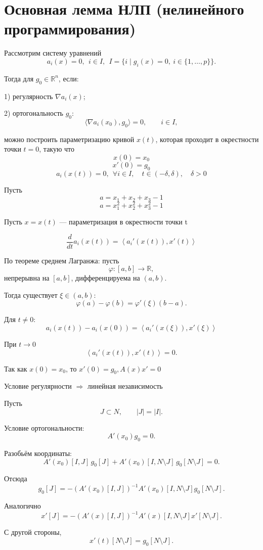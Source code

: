 \documentclass[12pt,a4paper]{article}
\begin{document}
\newpage

\section{Основная лемма НЛП (нелинейного программирования)}

Рассмотрим систему уравнений
\[
a_i(x)=0,
\ \
i\in I,
\ \ 
I=\{i\mid g_i(x)=0,\ i\in\{1,\ldots,p\}\}.
\]

Тогда для $g_0\in\mathbb{R}^n$, если:

1) регулярность $\nabla a_i(x)$;

2) ортогональность $g_0$:
\[
\langle\nabla a_i(x_0),g_0\rangle=0,
\qquad i\in I,
\]

можно построить параметризацию кривой $x(t)$, которая проходит в окрестности точки $t=0$, такую что
\[
x(0)=x_0
\]
\[
x'(0)=g_0
\]
\[
a_i(x(t))=0,
\ \
\forall i\in I,\quad
t\in(-\delta,\delta),\quad \delta>0
\]

Пусть
\[
a=x_1+x_2+x_3-1
\]
\[
a=x_1^2+x_2^2+x_3^2-1
\]

Пусть $x=x(t)$ --- параметризация в окрестности точки t

\[
\frac{d}{dt}a_i(x(t))
=
\left\langle
a_i'(x(t)),x'(t)
\right\rangle
\]

По теореме среднем Лагранжа:
пусть
\[
\varphi:[a,b]\to\mathbb{R},
\]
непрерывна на $[a,b]$, дифференцируема на $(a,b)$.

Тогда существует $\xi\in(a,b)$:
\[
\varphi(a)-\varphi(b)
=
\varphi'(\xi)(b-a).
\]

Для $t\neq0$:
\[
a_i(x(t))-a_i(x(0))
=
\left\langle
a_i'(x(\xi)),x'(\xi)
\right\rangle
\]

При $t\to0$
\[
\left\langle
a_i'(x(t)),x'(t)
\right\rangle=0.
\]

Так как $x(0)=x_0$, то $x'(0)=g_0, A(x)x'=0$

Условие регулярности $\Longrightarrow$ линейная независимость

Пусть
\[
J\subset N,
\qquad
|J|=|I|.
\]

Условие ортогональности:
\[
A'(x_0)g_0=0.
\]

Разобьём координаты:
\[
A'(x_0)[I,J]\,g_0[J]
+
A'(x_0)[I,N\setminus J]\,g_0[N\setminus J]
=
0.
\]

Отсюда
\[
g_0[J]
=
-
\left(
A'(x_0)[I,J]
\right)^{-1}
A'(x_0)[I,N\setminus J]
g_0[N\setminus J].
\]

Аналогично
\[
x'[J]
=
-
\left(
A'(x)[I,J]
\right)^{-1}
A'(x)[I,N\setminus J]
x'[N\setminus J].
\]

С другой стороны,
\[
x'(t)[N\setminus J]
=
g_0[N\setminus J].
\]
\end{document}
